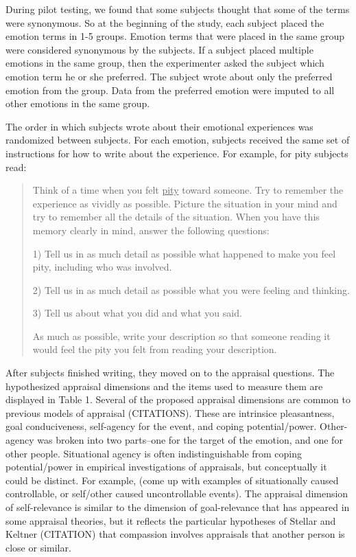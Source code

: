 \documentclass[man]{apa6}
\begin{document}
During pilot testing, we found that some subjects thought that some of the terms were synonymous. So at the beginning of the study, each subject placed the emotion terms in 1-5 groups. Emotion terms that were placed in the same group were considered synonymous by the subjects. If a subject placed multiple emotions in the same group, then the experimenter asked the subject which emotion term he or she preferred. The subject wrote about only the preferred emotion from the group. Data from the preferred emotion were imputed to all other emotions in the same group.

The order in which subjects wrote about their emotional experiences was randomized between subjects. For each emotion, subjects received the same set of instructions for how to write about the experience. For example, for pity subjects read:

\begin{quote}
Think of a time when you felt \underline{pity} toward someone. Try to remember the experience as vividly as possible. Picture the situation in your mind and try to remember all the details of the situation. When you have this memory clearly in mind, answer the following questions:

1) Tell us in as much detail as possible what happened to make you feel pity, including who was involved. 

2) Tell us in as much detail as possible what you were feeling and thinking.

3) Tell us about what you did and what you said.

As much as possible, write your description so that someone reading it would feel the pity you felt from reading your description.
\end{quote}

After subjects finished writing, they moved on to the appraisal questions. The hypothesized appraisal dimensions and the items used to measure them are displayed in Table 1. Several of the proposed appraisal dimensions are common to previous models of appraisal (CITATIONS). These are intrinsice pleasantness, goal conduciveness, self-agency for the event, and coping potential/power. Other-agency was broken into two parts--one for the target of the emotion, and one for other people. Situational agency is often indistinguishable from coping potential/power in empirical investigations of appraisals, but conceptually it could be distinct. For example, (come up with examples of situationally caused controllable, or self/other caused uncontrollable events). The appraisal dimension of self-relevance is similar to the dimension of goal-relevance that has appeared in some appraisal theories, but it reflects the particular hypotheses of Stellar and Keltner (CITATION) that compassion involves appraisals that another person is close or similar. 
\end{document}
